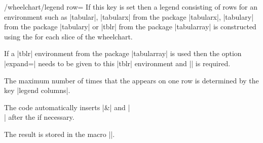 \documentclass[a4paper,english,dvipsnames]{ltxdoc}
\begin{document}
\begin{key}{/wheelchart/legend row=}
If this key is set then a legend consisting of rows for an environment such as |tabular|, |tabularx| from the package |tabularx|, |tabulary| from the package |tabulary| or |tblr| from the package |tabularray| is constructed using the  for each slice of the wheelchart.

If a |tblr| environment from the package |tabularray| is used then the option |expand=\WClegend| needs to be given to this |tblr| environment and || is required.

The maximum number of times that the  appears on one row is determined by the key |legend columns|.

The code automatically inserts |&| and |\\| after the  if necessary.

The result is stored in the macro |\WClegend|.
\begin{codeexample}[preamble={\usepackage{tabularray}
\UseTblrLibrary{counter,siunitx}}]
\begin{tikzpicture}
\wheelchart[
  after slices={
    \pgfdeclareradialshading{WCshading}{\pgfpoint{0cm}{0cm}}{
      color(0bp)=(\WCvarB);
      color(16.66666bp)=(\WCvarB);%
      color(20.83333bp)=(\WCvarB!10);%
      color(25bp)=(\WCvarB);
      color(50bp)=(\WCvarB)
    }
    \shade[even odd rule,shading=WCshading] (0,0) circle[radius=3] circle[radius=2];
  },
  data=,
  legend row={\tikz\fill[\WCvarB] (0,0) rectangle (0.3,0.3);%
     & \WCvarC & \WCvarA & \WCpercentagerounded & \WCvarD},
  legend={
    \node[anchor=west] at (3.5,0) {%
      \begin{tblr}[expand=\WClegend]{
        colspec={llS[table-format=3.0]S[table-format=2.0{\,\unit{\percent}}]l},
        column{1}={rightsep=0pt,appto={\ }},
        column{2}={leftsep=0pt},
        cell{2-Y}{4}={appto={\,\unit{\percent}}},
        row{1}=guard
      }
       & Fruit & Value & Percentage & Vitamins\\\hline
      \WClegend\hline
       & \textbf{Total} & \WCtotalnum & & \\
      \end{tblr}%
    };
  },
  slices style={
    fill=none,
    clip
  }
]{\exampleforthismanual}
\end{tikzpicture}
\end{codeexample}
\end{key}
\end{document}
